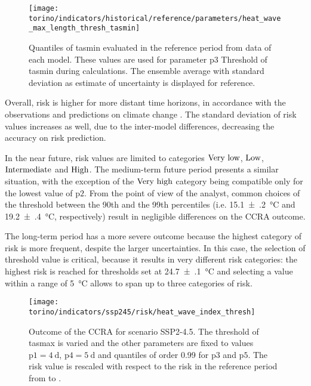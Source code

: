 \begin{figure}
  \centering
  \texttt{[image: torino/indicators/historical/reference/parameters/heat\_wave\_max\_length\_thresh\_tasmin]}
  \caption{Quantiles of \gls{tasmin} evaluated in the reference period from data of each model. These values are used for parameter $\mathrm{p3}$ {Threshold of \gls{tasmin}} during calculations. The ensemble average with standard deviation as estimate of uncertainty is displayed for reference.}
  \label{fig:parameters_heat_wave_max_length_thresh_tasmin}
\end{figure}

Overall, risk is higher for more distant time horizons, in accordance with the observations and predictions on climate change \cite[8-19]{2022IPCCClimateChange}. The standard deviation of risk values increases as well, due to the inter-model differences, decreasing the accuracy on risk prediction.

In the near future, risk values are limited to categories $\text{Very low}$, $\text{Low}$, $\text{Intermediate}$ and $\text{High}$. The medium-term future period presents a similar situation, with the exception of the $\text{Very high}$ category being compatible only for the lowest value of $\mathrm{p2}$. From the point of view of the analyst, common choices of the threshold between the 90th and the 99th percentiles (i.e. \qty{15.1(2)}{\degreeCelsius} and \qty{19.2(4)}{\degreeCelsius}, respectively) result in negligible differences on the \gls{CCRA} outcome.

The long-term period has a more severe outcome because the highest category of risk is more frequent, despite the larger uncertainties. In this case, the selection of threshold value is critical, because it results in very different risk categories: the highest risk is reached for thresholds set at \qty{24.7(1)}{\degreeCelsius} and selecting a value within a range of \qty{5}{\degreeCelsius} allows to span up to three categories of risk.

\begin{figure}
  \centering
  \texttt{[image: torino/indicators/ssp245/risk/heat\_wave\_index\_thresh]}
  \caption{Outcome of the \gls{CCRA} for scenario SSP2-4.5. The threshold of \gls{tasmax} is varied and the other parameters are fixed to values $\mathrm{p1} = \qty{4}{\day}$, $\mathrm{p4} = \qty{5}{\day}$ and quantiles of order 0.99 for $\mathrm{p3}$ and $\mathrm{p5}$. The risk value is rescaled with respect to the risk in the reference period from  to .}
  \label{fig:ssp245_risk_heat_wave_index_thresh-heat_wave_max_length_thresh_tasmax}
\end{figure}

